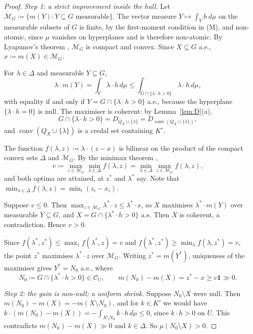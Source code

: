 \documentclass[11pt]{article}
\newcommand{\one}{\mathbf{1}}
\newcommand{\M}{\mathcal{M}}
\newcommand{\CC}{\mathcal{C}}
\DeclareMathOperator{\conv}{conv}
\theoremstyle{plain}
\theoremstyle{definition}
\theoremstyle{remark}
\begin{document}
\begin{proof}
\emph{Step 1: a strict improvement inside the hull.} Let $\M_G\coloneqq\{m(Y):Y
\subseteq G\text{ measurable}\}$. The vector measure $Y\mapsto\int_Yh\,d\mu$ on the
measurable subsets of $G$ is finite, by the first-moment condition in (M), and
non-atomic, since $\mu$ vanishes on hyperplanes and is therefore non-atomic. By Lyapunov's theorem
\cite{Lyapunov,Lindenstrauss}, $\M_G$ is compact and convex. Since $X\subseteq G$ a.e.,
$x\coloneqq m(X)\in\M_G$.

For $\lambda\in\Delta$ and measurable $Y\subseteq G$,
\[
  \lambda\cdot m(Y)=\int_Y\lambda\cdot h\,d\mu\le\int_{G\cap\{\lambda\cdot h>0\}}
  \lambda\cdot h\,d\mu ,
\]
with equality if and only if $Y=G\cap\{\lambda\cdot h>0\}$ a.e., because the hyperplane
$\{\lambda\cdot h=0\}$ is null. The maximiser is coherent: by Lemma~\ref{lem:D}(a),
\[
  G\cap\{\lambda\cdot h>0\}=D_{Q_X\cup\{\lambda\}}=D_{\conv(Q_X\cup\{\lambda\})},
\]
and $\conv(Q_X\cup\{\lambda\})$ is a credal set containing $K'$.

The function $f(\lambda,z)\coloneqq\lambda\cdot(z-x)$ is bilinear on the product of the
compact convex sets $\Delta$ and $\M_G$. By the minimax theorem \cite{Sion},
\[
  v\coloneqq\max_{z\in\M_G}\min_{\lambda\in\Delta}f(\lambda,z)
  =\min_{\lambda\in\Delta}\max_{z\in\M_G}f(\lambda,z),
\]
and both optima are attained, at $z^\ast$ and $\lambda^\ast$ say. Note that
$\min_{\lambda\in\Delta}f(\lambda,z)=\min_i(z_i-x_i)$.

Suppose $v\le0$. Then $\max_{z\in\M_G}\lambda^\ast\cdot z\le\lambda^\ast\cdot x$, so $X$
maximises $\lambda^\ast\cdot m(Y)$ over measurable $Y\subseteq G$, and $X=G\cap
\{\lambda^\ast\cdot h>0\}$ a.e. Then $X$ is coherent, a contradiction. Hence $v>0$.

Since $f(\lambda^\ast,z^\ast)\le\max_zf(\lambda^\ast,z)=v$ and $f(\lambda^\ast,z^\ast)
\ge\min_\lambda f(\lambda,z^\ast)=v$, the point $z^\ast$ maximises $\lambda^\ast\cdot z$
over $\M_G$. Writing $z^\ast=m(Y^\ast)$, uniqueness of the maximiser gives
$Y^\ast=N_0$ a.e., where
\[
  N_0\coloneqq G\cap\{\lambda^\ast\cdot h>0\}\in\CC_U,\qquad
  m(N_0)-m(X)=z^\ast-x\ge v\one\gg0 .
\]

\emph{Step 2: the gain is non-null; a uniform shrink.} Suppose $N_0\setminus X$ were
null. Then $m(N_0)-m(X)=-m(X\setminus N_0)$, and for $k\in K'$ we would have
$k\cdot(m(N_0)-m(X))=-\int_{X\setminus N_0}k\cdot h\,d\mu\le0$, since $k\cdot h>0$ on
$U$. This contradicts $m(N_0)-m(X)\gg0$ and $k\in\Delta$. So $\mu(N_0\setminus X)>0$.


\end{proof}
\end{document}
